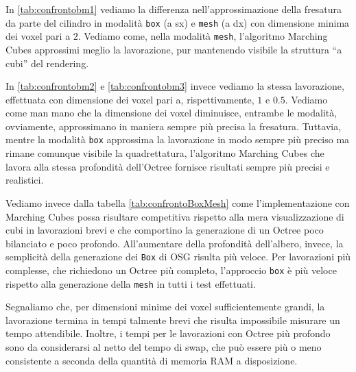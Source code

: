In \ref{tab:confrontobm1} vediamo la differenza nell'approssimazione della fresatura da parte del cilindro in modalità \texttt{box} (a sx) e \texttt{mesh} (a dx) con dimensione minima dei voxel pari a $2$. Vediamo come, nella modalità \texttt{mesh}, l'algoritmo Marching Cubes approssimi meglio la lavorazione, pur mantenendo visibile la struttura ``a cubi'' del rendering.

In \ref{tab:confrontobm2} e \ref{tab:confrontobm3} invece vediamo la stessa lavorazione, effettuata con dimensione dei voxel pari a, rispettivamente, $1$ e $0.5$. Vediamo come man mano che la dimensione dei voxel diminuisce, entrambe le modalità, ovviamente, approssimano in maniera sempre più precisa la fresatura. Tuttavia, mentre la modalità \texttt{box} approssima la lavorazione in modo sempre più preciso ma rimane comunque visibile la quadrettatura, l'algoritmo Marching Cubes che lavora alla stessa profondità dell'Octree fornisce risultati sempre più precisi e realistici.

Vediamo invece dalla tabella \ref{tab:confrontoBoxMesh} come l'implementazione con Marching Cubes possa risultare competitiva rispetto alla mera visualizzazione di cubi in lavorazioni brevi e che comportino la generazione di un Octree poco bilanciato e poco profondo. All'aumentare della profondità dell'albero, invece, la semplicità della generazione dei \texttt{Box} di OSG risulta più veloce. Per lavorazioni più complesse, che richiedono un Octree più completo, l'approccio \texttt{box} è più veloce rispetto alla generazione della \texttt{mesh} in tutti i test effettuati.

Segnaliamo che, per dimensioni minime dei voxel sufficientemente grandi, la lavorazione termina in tempi talmente brevi che risulta impossibile misurare un tempo attendibile. Inoltre, i tempi per le lavorazioni con Octree più profondo sono da considerarsi al netto del tempo di swap, che può essere più o meno consistente a seconda della quantità di memoria RAM a disposizione.

